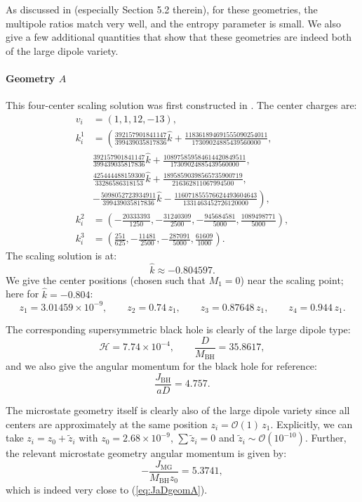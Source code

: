 \documentclass[12pt,a4paper]{article}
\newcommand{\be}{\begin{equation}}
\newcommand{\ee}{\end{equation}}
\begin{document}
As discussed in \cite{Bena:2020uup} (especially Section 5.2 therein), for these geometries, the multipole ratios match very well, and the entropy parameter is small. We also give a few additional quantities that show that these geometries are indeed both of the large dipole variety.

\paragraph{Geometry \texorpdfstring{$A$}{A}}
This four-center scaling solution was first constructed in \cite{Heidmann:2017cxt}. The center charges are:
\be\begin{aligned}
 v_i &= \left( 1, 1, 12, -13 \right),\\
  k_i^1 &= \left( \frac{392157901841147 }{399439035817836}\hat{k}+\frac{118361894691555090254011}{17309024885439560000},\right.\\
  & \frac{392157901841147 }{399439035817836}\hat{k}+\frac{108975859584614420849511}{17309024885439560000},\\
  &\frac{425444488159300 }{33286586318153}\hat{k}+\frac{18958590398565735900719}{216362811067994500},\\
  &\left.-\frac{5098052723934911 }{399439035817836}\hat{k}-\frac{116071855576624493604643}{1331463452726120000} \right),\\
  k_i^2 &= \left(-\frac{20333393}{1250} ,-\frac{31240309}{2500},-\frac{945684581}{5000},\frac{1089498771}{5000}  \right),\\
  k_i^3 &= \left( \frac{251}{625},-\frac{11481}{2500},-\frac{287091}{5000},\frac{61609}{1000}  \right).
\end{aligned}\ee
The scaling solution is at:
\be \hat{k} \approx -0.804597.\ee
We give the center positions (chosen such that $M_1=0$) near the scaling point; here for $\hat{k} = -0.804$:
\be z_1 = 3.01459\times 10^{-9}, \qquad z_2 = 0.74\, z_1, \qquad z_3 = 0.87648\, z_1, \qquad z_4 = 0.944\, z_1.\ee

The corresponding supersymmetric black hole is clearly of the large dipole type:
\be \mathcal{H} = 7.74 \times 10^{-4}, \qquad \frac{D}{M_\text{BH}} = 35.8617,\ee
and we also give the angular momentum for the black hole for reference:
\be \label{eq:JaDgeomA} \frac{J_\text{BH}}{aD} = 4.757.\ee

The microstate geometry itself is clearly also of the large dipole variety since all centers are approximately at the same position $z_i=\mathcal{O}(1)\, z_1$. Explicitly, we can take $z_i=z_0+\tilde z_i$ with $z_0 = 2.68\times 10^{-9}$,  $\sum\tilde z_i = 0$ and $\tilde z_i\sim \mathcal{O}(10^{-10})$.
%
Further, the relevant microstate geometry angular momentum is given by:
\be -\frac{J_\text{MG}}{M_\text{BH} z_0} = 5.3741,\ee
which is indeed very close to (\ref{eq:JaDgeomA}).
\end{document}
